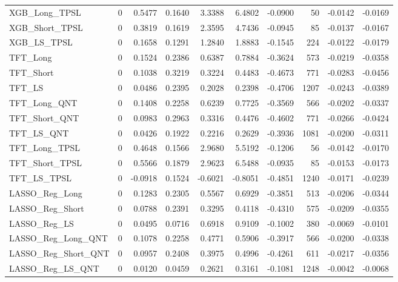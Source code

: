 \begin{tabular}{llrrrrrrrr}
\cline{1-10}
XGB\_Long\_TPSL & 0 & 0.5477 & 0.1640 & 3.3388 & 6.4802 & -0.0900 & 50 & -0.0142 & -0.0169 \\
\cline{1-10}
XGB\_Short\_TPSL & 0 & 0.3819 & 0.1619 & 2.3595 & 4.7436 & -0.0945 & 85 & -0.0137 & -0.0167 \\
\cline{1-10}
XGB\_LS\_TPSL & 0 & 0.1658 & 0.1291 & 1.2840 & 1.8883 & -0.1545 & 224 & -0.0122 & -0.0179 \\
\cline{1-10}
TFT\_Long & 0 & 0.1524 & 0.2386 & 0.6387 & 0.7884 & -0.3624 & 573 & -0.0219 & -0.0358 \\
\cline{1-10}
TFT\_Short & 0 & 0.1038 & 0.3219 & 0.3224 & 0.4483 & -0.4673 & 771 & -0.0283 & -0.0456 \\
\cline{1-10}
TFT\_LS & 0 & 0.0486 & 0.2395 & 0.2028 & 0.2398 & -0.4706 & 1207 & -0.0243 & -0.0389 \\
\cline{1-10}
TFT\_Long\_QNT & 0 & 0.1408 & 0.2258 & 0.6239 & 0.7725 & -0.3569 & 566 & -0.0202 & -0.0337 \\
\cline{1-10}
TFT\_Short\_QNT & 0 & 0.0983 & 0.2963 & 0.3316 & 0.4476 & -0.4602 & 771 & -0.0266 & -0.0424 \\
\cline{1-10}
TFT\_LS\_QNT & 0 & 0.0426 & 0.1922 & 0.2216 & 0.2629 & -0.3936 & 1081 & -0.0200 & -0.0311 \\
\cline{1-10}
TFT\_Long\_TPSL & 0 & 0.4648 & 0.1566 & 2.9680 & 5.5192 & -0.1206 & 56 & -0.0142 & -0.0170 \\
\cline{1-10}
TFT\_Short\_TPSL & 0 & 0.5566 & 0.1879 & 2.9623 & 6.5488 & -0.0935 & 85 & -0.0153 & -0.0173 \\
\cline{1-10}
TFT\_LS\_TPSL & 0 & -0.0918 & 0.1524 & -0.6021 & -0.8051 & -0.4851 & 1240 & -0.0171 & -0.0239 \\
\cline{1-10}
LASSO\_Reg\_Long & 0 & 0.1283 & 0.2305 & 0.5567 & 0.6929 & -0.3851 & 513 & -0.0206 & -0.0344 \\
\cline{1-10}
LASSO\_Reg\_Short & 0 & 0.0788 & 0.2391 & 0.3295 & 0.4118 & -0.4310 & 575 & -0.0209 & -0.0355 \\
\cline{1-10}
LASSO\_Reg\_LS & 0 & 0.0495 & 0.0716 & 0.6918 & 0.9109 & -0.1002 & 380 & -0.0069 & -0.0101 \\
\cline{1-10}
LASSO\_Reg\_Long\_QNT & 0 & 0.1078 & 0.2258 & 0.4771 & 0.5906 & -0.3917 & 566 & -0.0200 & -0.0338 \\
\cline{1-10}
LASSO\_Reg\_Short\_QNT & 0 & 0.0957 & 0.2408 & 0.3975 & 0.4996 & -0.4261 & 611 & -0.0217 & -0.0356 \\
\cline{1-10}
LASSO\_Reg\_LS\_QNT & 0 & 0.0120 & 0.0459 & 0.2621 & 0.3161 & -0.1081 & 1248 & -0.0042 & -0.0068 \\

\end{tabular}
